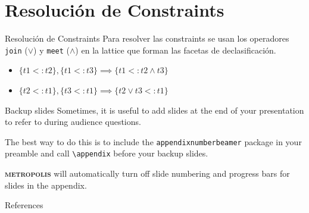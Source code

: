 \documentclass[aspectratio=169,10pt]{beamer}
\newcommand{\themename}{\textbf{\textsc{metropolis}}\xspace}
\begin{document}
\section{Resolución de Constraints}
\begin{frame}[fragile]{Resolución de Constraints}
  Para resolver las constraints se usan los operadores \texttt{join} ($\lor$) y \texttt{meet} ($\land$) en la lattice que forman las facetas de declasificación.
  \begin{itemize}
    \item{$\{t1 <: t2\}, \{t1 <: t3\} \implies \{t1 <: t2 \land t3 \} $}
    \item{$\{t2 <: t1\}, \{t3 <: t1\} \implies \{t2 \lor t3 <: t1\} $}
  \end{itemize}
\end{frame}

{
\begin{frame}[standout]
  
\end{frame}
}

\appendix

\begin{frame}[fragile]{Backup slides}
  Sometimes, it is useful to add slides at the end of your presentation to
  refer to during audience questions.

  The best way to do this is to include the \verb|appendixnumberbeamer|
  package in your preamble and call \verb|\appendix| before your backup slides.

  \themename will automatically turn off slide numbering and progress bars for
  slides in the appendix.
\end{frame}

\begin{frame}[allowframebreaks]{References}

  
  

\end{frame}
\end{document}
